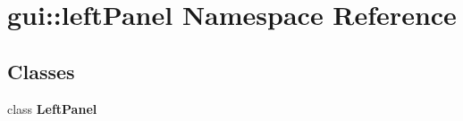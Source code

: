 \section{gui::leftPanel Namespace Reference}
\label{namespacegui_1_1leftPanel}


\subsection*{Classes}
\begin{CompactItemize}
\item 
class {\bf LeftPanel}
\end{CompactItemize}
